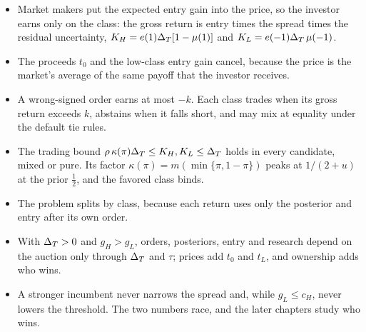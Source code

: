\begin{chaptersummary}
\begin{itemize}
\item Market makers put the expected entry gain into the price, so the investor earns only on the class: the gross
return is entry times the spread times the residual uncertainty, \(K_H=e(1)\Delta_T[1-\mu(1)]\) and
\(K_L=e(-1)\Delta_T\,\mu(-1)\).
\item The proceeds \(t_0\) and the low-class entry gain cancel, because the price is the market's average of the
same payoff that the investor receives.
\item A wrong-signed order earns at most \(-k\). Each class trades when its gross return exceeds \(k\), abstains when
it falls short, and may mix at equality under the default tie rules.
\item The trading bound \(\rho\,\kappa(\pi)\Delta_T\le K_H,K_L\le\Delta_T\) holds in every candidate, mixed or pure. Its factor
\(\kappa(\pi)=m(\min\{\pi,1-\pi\})\) peaks at \(1/(2+u)\) at the prior \(\tfrac12\), and the favored class binds.
\item The problem splits by class, because each return uses only the posterior and entry after its own order.
\item With \(\Delta_T>0\) and \(g_H>g_L\), orders, posteriors, entry and research depend on the auction only through
\(\Delta_T\) and \(\tau\); prices add \(t_0\) and \(t_L\), and ownership adds who wins.
\item A stronger incumbent never narrows the spread and, while \(g_L\le c_H\), never lowers the threshold. The two
numbers race, and the later chapters study who wins.
\end{itemize}
\end{chaptersummary}

\answersection


